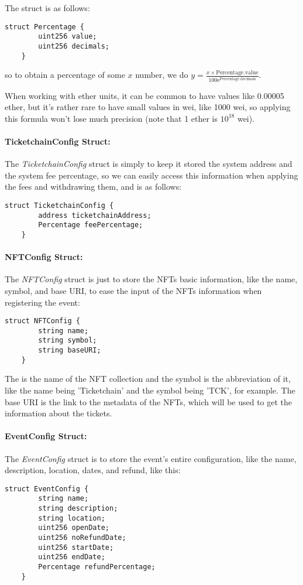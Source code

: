 The struct is as follows:
\begin{lstlisting}[caption=Percentage struct]
    struct Percentage {
        uint256 value;
        uint256 decimals;
    }
\end{lstlisting}
so to obtain a percentage of some $x$ number, we do $y = \frac{x \times
		\text{Percentage.value}}{100\mathrm{e}^\text{Percentage.decimals}}$.

When working with ether units, it can be common to have values like 0.00005
ether, but it's rather rare to have small values in wei, like 1000 wei, so
applying this formula won't lose much precision (note that 1 ether is $10^{18}$
wei).

\paragraph{TicketchainConfig Struct:} The \textit{TicketchainConfig} struct is simply to keep it stored the system
address and the system fee percentage, so we can easily access this information
when applying the fees and withdrawing them, and is as follows:
\begin{lstlisting}[caption=TicketchainConfig struct]
    struct TicketchainConfig {
        address ticketchainAddress;
        Percentage feePercentage;
    }
\end{lstlisting}

\paragraph{NFTConfig Struct:} The \textit{NFTConfig} struct is just to store the NFTs basic information, like
the name, symbol, and base URI, to ease the input of the NFTs information when
registering the event:
\begin{lstlisting}[caption=NFTConfig struct]
    struct NFTConfig {
        string name;
        string symbol;
        string baseURI;
    }
\end{lstlisting}
The is the name of the NFT collection and the symbol is the abbreviation of it,
like the name being 'Ticketchain' and the symbol being 'TCK', for example. The
base URI is the link to the metadata of the NFTs, which will be used to get the
information about the tickets.

\paragraph{EventConfig Struct:} The \textit{EventConfig} struct is to store the event's entire configuration,
like the name, description, location, dates, and refund, like this:
\begin{lstlisting}[caption=EventConfig struct]
    struct EventConfig {
        string name;
        string description;
        string location;
        uint256 openDate;
        uint256 noRefundDate;
        uint256 startDate;
        uint256 endDate;
        Percentage refundPercentage;
    }
\end{lstlisting}

